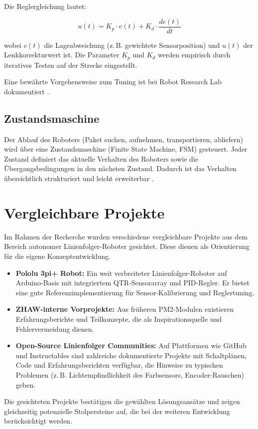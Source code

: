 \documentclass[12pt,a4paper]{article}
\begin{document}
	Die Reglergleichung lautet:
	
	\begin{equation}
		u(t) = K_p \cdot e(t) + K_d \cdot \frac{de(t)}{dt}
	\end{equation}
	
	wobei $e(t)$ die Lageabweichung (z.\,B. gewichtete Sensorposition) und $u(t)$ der Lenkkorrekturwert ist. Die Parameter $K_p$ und $K_d$ werden empirisch durch iteratives Testen auf der Strecke eingestellt.
	
	Eine bewährte Vorgehensweise zum Tuning ist bei Robot Research Lab dokumentiert \cite{pid_tuning}.
	
	\subsection{Zustandsmaschine}
	
	Der Ablauf des Roboters (Paket suchen, aufnehmen, transportieren, abliefern) wird über eine Zustandsmaschine (Finite State Machine, FSM) gesteuert. Jeder Zustand definiert das aktuelle Verhalten des Roboters sowie die Übergangsbedingungen in den nächsten Zustand. Dadurch ist das Verhalten übersichtlich strukturiert und leicht erweiterbar \cite{fsm_wikipedia}.
	
	\section{Vergleichbare Projekte}
	
	Im Rahmen der Recherche wurden verschiedene vergleichbare Projekte aus dem Bereich autonomer Linienfolger-Roboter gesichtet. Diese dienen als Orientierung für die eigene Konzeptentwicklung.
	
	\begin{itemize}
		\item \textbf{Pololu 3pi+ Robot:} Ein weit verbreiteter Linienfolger-Roboter auf Arduino-Basis mit integriertem QTR-Sensorarray und PID-Regler. Er bietet eine gute Referenzimplementierung für Sensor-Kalibrierung und Reglertuning.
		
		\item \textbf{ZHAW-interne Vorprojekte:} Aus früheren PM2-Modulen existieren Erfahrungsberichte und Teilkonzepte, die als Inspirationsquelle und Fehlervermeidung dienen.
		
		\item \textbf{Open-Source Linienfolger Communities:} Auf Plattformen wie GitHub und Instructables sind zahlreiche dokumentierte Projekte mit Schaltplänen, Code und Erfahrungsberichten verfügbar, die Hinweise zu typischen Problemen (z.\,B. Lichtempfindlichkeit des Farbsensors, Encoder-Rauschen) geben.
	\end{itemize}
	
	Die gesichteten Projekte bestätigen die gewählten Lösungsansätze und zeigen gleichzeitig potenzielle Stolpersteine auf, die bei der weiteren Entwicklung berücksichtigt werden.
	
	\newpage
	\printbibliography
	
\end{document}
